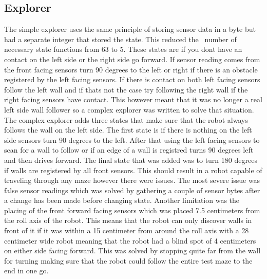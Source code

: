\documentclass[10pt,a4paper,twocolumn]{article}
\begin{document}
\subsection{Explorer}
The simple explorer uses the same principle of storing sensor data in a byte but
had a separate integer that stored the state. This reduced the  number of
necessary state functions from 63 to 5. These states are if you dont have an
contact on the left side or the right side go forward. If sensor reading comes
from the front facing sensors turn 90 degrees to the left or right if there is
an obstacle registered by the left facing sensors. If there is contact on both
left facing sensors follow the left wall and if thats not the case try following
the right wall if the right facing sensors have contact. This however meant that
it was no longer a real left side wall follower so a complex explorer was
written to solve that situation. The complex explorer adds three states that
make sure that the robot always follows the wall on the left side. The first
state is if there is nothing on the left side sensors turn 90 degrees to the
left. After that using the left facing sensors to scan for a wall to follow or
if an edge of a wall is registred turns 90 degrees left and then drives forward.
The final state that was added was to turn 180 degrees if walls are registered
by all front sensors. This should result in a robot capable of traveling through
any maze however there were issues. The most severe issue was false sensor
readings which was solved by gathering a couple of sensor bytes after a change
has been made before changing state. Another limitation was the placing of the
front forward facing sensors which was placed 7.5 centimeters from the roll axis
of the robot. This means that the robot can only discover walls in front of it
if it was within a 15 centimeter from around the roll axis with a 28 centimeter
wide robot meaning that the robot had a blind spot of 4 centimeters on either
side facing forward. This was solved by stopping quite far from the wall for
turning making sure that the robot could follow the entire test maze to the end
in one go.
\end{document}
